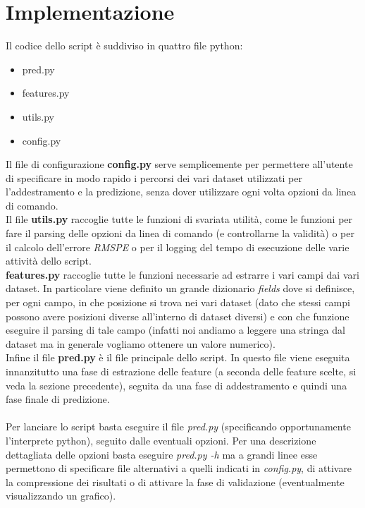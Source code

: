 \section*{Implementazione}

Il codice dello script è suddiviso in quattro file python:

\begin{itemize}
    \item pred.py
    \item features.py
    \item utils.py
    \item config.py
\end{itemize}

Il file di configurazione \textbf{config.py} serve semplicemente per permettere all'utente di specificare in modo rapido i percorsi dei vari dataset utilizzati per l'addestramento e la predizione, senza dover utilizzare ogni volta opzioni da linea di comando.\\
Il file \textbf{utils.py} raccoglie tutte le funzioni di svariata utilità, come le funzioni per fare il parsing delle opzioni da linea di comando (e controllarne la validità) o per il calcolo dell'errore \textit{RMSPE} o per il logging del tempo di esecuzione delle varie attività dello script.\\
\textbf{features.py} raccoglie tutte le funzioni necessarie ad estrarre i vari campi dai vari dataset. In particolare viene definito un grande dizionario \textit{fields} dove si definisce, per ogni campo, in che posizione si trova nei vari dataset (dato che stessi campi possono avere posizioni diverse all'interno di dataset diversi) e con che funzione eseguire il parsing di tale campo (infatti noi andiamo a leggere una stringa dal dataset ma in generale vogliamo ottenere un valore numerico).\\
Infine il file \textbf{pred.py} è il file principale dello script. In questo file viene eseguita innanzitutto una fase di estrazione delle feature (a seconda delle feature scelte, si veda la sezione precedente), seguita da una fase di addestramento e quindi una fase finale di predizione.\\
\\
Per lanciare lo script basta eseguire il file \textit{pred.py} (specificando opportunamente l'interprete python), seguito dalle eventuali opzioni. Per una descrizione dettagliata delle opzioni basta eseguire \textit{pred.py -h} ma a grandi linee esse  permettono di specificare file alternativi a quelli indicati in \textit{config.py}, di attivare la compressione dei risultati o di attivare la fase di validazione (eventualmente visualizzando un grafico).\\
